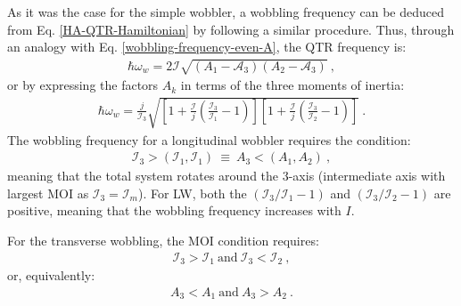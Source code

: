 As it was the case for the simple wobbler, a wobbling frequency can be deduced from Eq. \ref{HA-QTR-Hamiltonian} by following a similar procedure. Thus, through an analogy with Eq. \ref{wobbling-frequency-even-A}, the QTR frequency is:
\begin{align}
    \hbar\omega_w=2\mathscr{I}\sqrt{\left(A_1-\mathscr{A}_3\right)\left(A_2-\mathscr{A}_3\right)}\ ,
    \label{wobbling-frequency-odd-A-inertiaParams}
\end{align}
or by expressing the factors $A_k$ in terms of the three moments of inertia:
\begin{align}
    \hbar\omega_w=\frac{j}{\mathcal{I}_3}\sqrt{\left[1+\frac{\mathscr{I}}{j}\left(\frac{\mathcal{I}_3}{\mathcal{I}_1}-1\right)\right]\left[1+\frac{\mathscr{I}}{j}\left(\frac{\mathcal{I}_3}{\mathcal{I}_2}-1\right)\right]}\ .
    \label{wobbling-frequency-odd-A-MOI}
\end{align}
The wobbling frequency for a longitudinal wobbler requires the condition:
\begin{align}
    \mathcal{I}_3>(\mathcal{I}_1,\mathcal{I}_1)\ \equiv\ A_3<(A_1,A_2)\ ,
\end{align}
meaning that the total system rotates around the $3$-axis (intermediate axis with largest MOI as $\mathcal{I}_3=\mathcal{I}_m$). For LW, both the $(\mathcal{I}_3/\mathcal{I}_1-1)$ and $(\mathcal{I}_3/\mathcal{I}_2-1)$ are positive, meaning that the wobbling frequency increases with $I$.

For the transverse wobbling, the MOI condition requires:
\begin{align}
    \mathcal{I}_3>\mathcal{I}_1\ \text{and}\ \mathcal{I}_3<\mathcal{I}_2\ ,
\end{align}
or, equivalently:
\begin{align}
    A_3<A_1\ \text{and}\ A_3>A_2\ .
\end{align}

